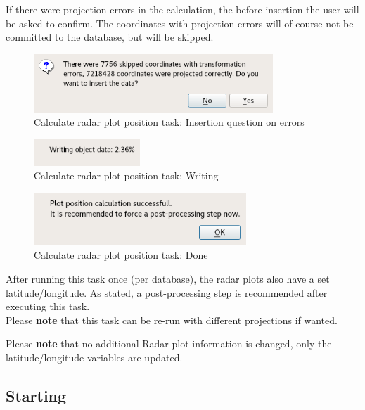 If there were projection errors in the calculation, the before insertion the user will be asked to confirm. The coordinates with projection errors will of course not be committed to the database, but will be skipped.

\begin{figure}[H]
  \center
    \includegraphics[width=9cm,frame]{../screenshots/task_calc_radar_insert.png}
  \caption{Calculate radar plot position task: Insertion question on errors}
\end{figure}


\begin{figure}[H]
  \center
    \includegraphics[width=4cm,frame]{../screenshots/task_calc_radar_write.png}
  \caption{Calculate radar plot position task: Writing}
\end{figure}

\begin{figure}[H]
  \center
    \includegraphics[width=8cm,frame]{../screenshots/task_calc_radar_done.png}
  \caption{Calculate radar plot position task: Done}
\end{figure}

After running this task once (per database), the radar plots also have a set latitude/longitude. As stated, a post-processing step is recommended after executing this task. \\

Please \textbf{note} that this task can be re-run with different projections if wanted.

Please \textbf{note} that no additional Radar plot information is changed, only the latitude/longitude variables are updated.
 

\subsection{Starting}

